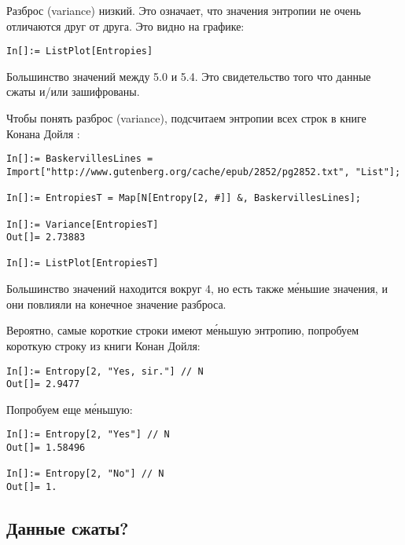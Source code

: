 Разброс (variance) низкий.
Это означает, что значения энтропии не очень отличаются друг от друга.
Это видно на графике:

\begin{lstlisting}
In[]:= ListPlot[Entropies]
\end{lstlisting}

\begin{figure}[H]
\centering
{}
\end{figure}

Большинство значений между 5.0 и 5.4.
Это свидетельство того что данные сжаты и/или зашифрованы.

Чтобы понять разброс (variance), подсчитаем энтропии всех строк в книге Конана Дойля :

\begin{lstlisting}
In[]:= BaskervillesLines = Import["http://www.gutenberg.org/cache/epub/2852/pg2852.txt", "List"];

In[]:= EntropiesT = Map[N[Entropy[2, #]] &, BaskervillesLines];

In[]:= Variance[EntropiesT]
Out[]= 2.73883

In[]:= ListPlot[EntropiesT]
\end{lstlisting}

\begin{figure}[H]
\centering
{}
\end{figure}

Большинство значений находится вокруг 4, но есть также м\'{е}ньшие значения, и они повлияли на конечное значение разброса.

Вероятно, самые короткие строки имеют м\'{е}ньшую энтропию, попробуем короткую строку из книги Конан Дойля:

\begin{lstlisting}
In[]:= Entropy[2, "Yes, sir."] // N
Out[]= 2.9477
\end{lstlisting}

Попробуем еще м\'{е}ньшую:

\begin{lstlisting}
In[]:= Entropy[2, "Yes"] // N
Out[]= 1.58496

In[]:= Entropy[2, "No"] // N
Out[]= 1.
\end{lstlisting}

\subsection{Данные сжаты?}

